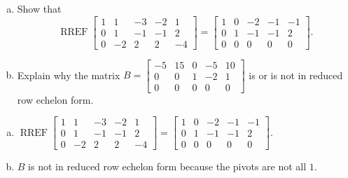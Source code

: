 
\begin{exerciseStatement}

\begin{enumerate}[(a)]
\item Show that \[\operatorname{RREF} \left[\begin{array}{ccccc}
1 & 1 & -3 & -2 & 1 \\
0 & 1 & -1 & -1 & 2 \\
0 & -2 & 2 & 2 & -4
\end{array}\right] = \left[\begin{array}{ccccc}
1 & 0 & -2 & -1 & -1 \\
0 & 1 & -1 & -1 & 2 \\
0 & 0 & 0 & 0 & 0
\end{array}\right] .\]
\item Explain why the matrix \(B= \left[\begin{array}{ccccc}
-5 & 15 & 0 & -5 & 10 \\
0 & 0 & 1 & -2 & 1 \\
0 & 0 & 0 & 0 & 0
\end{array}\right] \) is or is not in reduced row echelon form.
\end{enumerate}
    
\end{exerciseStatement}
    
\begin{exerciseAnswer} 

\begin{enumerate}[(a)]
\item \(\operatorname{RREF} \left[\begin{array}{ccccc}
1 & 1 & -3 & -2 & 1 \\
0 & 1 & -1 & -1 & 2 \\
0 & -2 & 2 & 2 & -4
\end{array}\right] = \left[\begin{array}{ccccc}
1 & 0 & -2 & -1 & -1 \\
0 & 1 & -1 & -1 & 2 \\
0 & 0 & 0 & 0 & 0
\end{array}\right] .\)
\item \(B\) is not in reduced row echelon form because the pivots are not all \(1\). 
\end{enumerate}
    
\end{exerciseAnswer}
    
